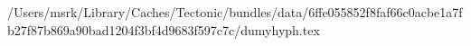 /Users/msrk/Library/Caches/Tectonic/bundles/data/6ffe055852f8faf66c0acbe1a7fb27f87b869a90bad1204f3bf4d9683f597c7c/dumyhyph.tex